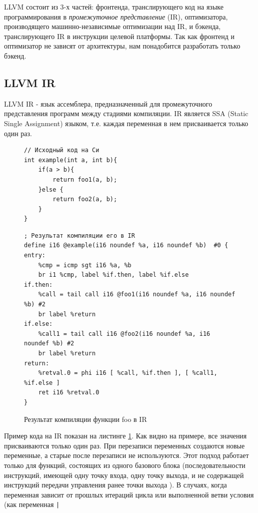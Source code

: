 \documentclass[a4paper,14pt]{extarticle}
\begin{document}
LLVM состоит из 3-х частей: фронтенда, транслирующего код на языке программирования в \emph{промежуточное представление} (IR)\cite{llvm:langref}, оптимизатора, производящего машинно-независимые оптимизации над IR, и бэкенда, транслирующего IR в инструкции целевой платформы. Так как фронтенд и оптимизатор не зависят от архитектуры, нам %
понадобится разработать только бэкенд.

\subsection{LLVM IR}
LLVM IR - язык ассемблера, предназначенный для промежуточного представления программ между стадиями компиляции. IR является SSA (Static Single Assignment) языком, т.е. каждая переменная в нем присваивается только один раз. 
\begin{figure}[h!]
	\begin{verbatim}
// Исходный код на Си
int example(int a, int b){
	if(a > b){
		return foo1(a, b);
	}else {
		return foo2(a, b);
	}
}
	\end{verbatim}
	
	\begin{verbatim}
; Результат компиляции его в IR
define i16 @example(i16 noundef %a, i16 noundef %b)  #0 {
entry:
	%cmp = icmp sgt i16 %a, %b
	br i1 %cmp, label %if.then, label %if.else
if.then: 
	%call = tail call i16 @foo1(i16 noundef %a, i16 noundef %b) #2
	br label %return
if.else: 
	%call1 = tail call i16 @foo2(i16 noundef %a, i16 noundef %b) #2
	br label %return
return: 
	%retval.0 = phi i16 [ %call, %if.then ], [ %call1, %if.else ]
	ret i16 %retval.0
}
	\end{verbatim}
	\caption{Результат компиляции функции foo в IR}
	\label{ir_example}
\end{figure}

Пример кода на IR показан на листинге \ref{ir_example}. Как видно на примере, все значения присваиваются только один раз. При перезаписи переменных создаются новые переменные, а старые после перезаписи не используются. Этот подход работает только для функций, состоящих из одного базового блока (последовательности инструкций, имеющей одну точку входа, одну точку выхода, и не содержащей инструкций передачи управления ранее точки выхода \cite{contraol_flow_analysis}). В случаях, когда переменная зависит от прошлых итераций цикла или выполненной ветви условия  (как переменная \texttt|%
\end{document}

